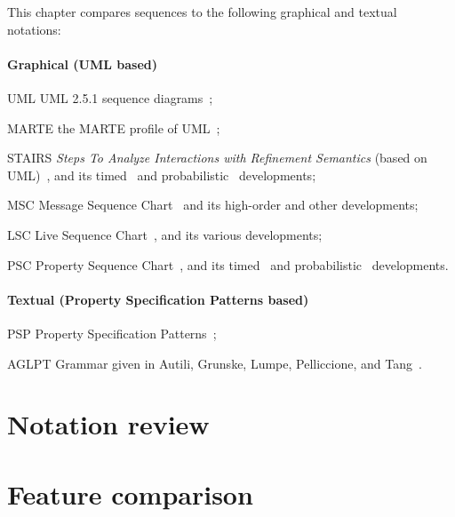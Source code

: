 
This chapter compares \langname{} sequences to the following graphical
and textual notations:

\newcommand{\featname}[1]{\textsf{#1}}

\paragraph{Graphical (UML based)}

\begin{featset}
\item[UML] UML 2.5.1 sequence diagrams~\cite{uml251};
\item[MARTE] the MARTE profile of UML~\cite{marte12};
\item[STAIRS] \emph{Steps To Analyze Interactions with Refinement Semantics} (based on UML)~\cite{Haugen03-STAIRS},
and its timed~\cite{Haugen05-TimedSTAIRS} and
probabilistic~\cite{Refsdal05-ProbabilisticSTAIRS} developments;
\item[MSC] Message Sequence Chart~\cite{Harel03-MSC} and its high-order and
other developments;
\item[LSC] Live Sequence Chart~\cite{lsc}, and its
various developments;
\item[PSC] Property Sequence Chart~\cite{psc}, and its
timed~\cite{tpsc} and probabilistic~\cite{ptpsc} developments.
\end{featset}

\paragraph{Textual (Property Specification Patterns based)}

\begin{featset}
\item[PSP] Property Specification Patterns~\cite{psp,pspsite};
\item[AGLPT] Grammar given in Autili, Grunske, Lumpe, Pelliccione, and Tang~\cite{aglpt}.
\end{featset}

\section{Notation review}\label{sec:seq-comparison-review}


\section{Feature comparison}\label{sec:seq-comparison-features}


